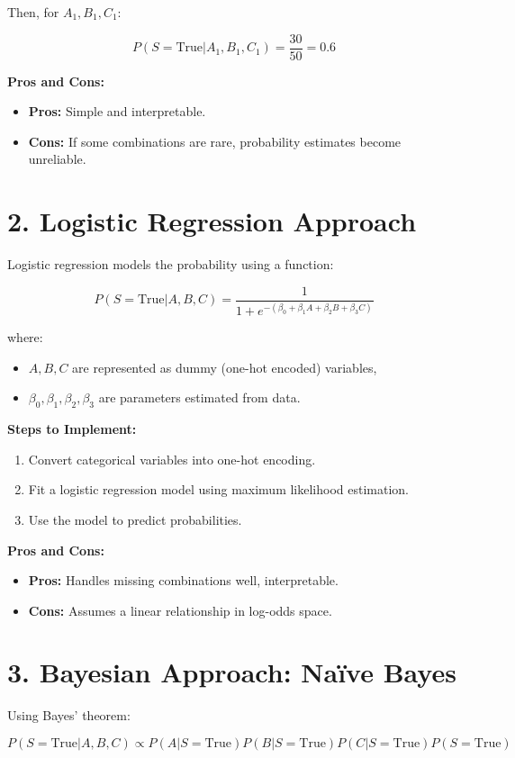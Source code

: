 \documentclass{article}
\begin{document}
Then, for \( A_1, B_1, C_1 \):

\[
P(S = \text{True} | A_1, B_1, C_1) = \frac{30}{50} = 0.6
\]

\textbf{Pros and Cons:}
\begin{itemize}
    \item \textbf{Pros:} Simple and interpretable.
    \item \textbf{Cons:} If some combinations are rare, probability estimates become unreliable.
\end{itemize}

\section{2. Logistic Regression Approach}
Logistic regression models the probability using a function:

\[
P(S = \text{True} | A, B, C) = \frac{1}{1 + e^{-(\beta_0 + \beta_1 A + \beta_2 B + \beta_3 C)}}
\]

where:
\begin{itemize}
    \item \( A, B, C \) are represented as dummy (one-hot encoded) variables,
    \item \( \beta_0, \beta_1, \beta_2, \beta_3 \) are parameters estimated from data.
\end{itemize}

\textbf{Steps to Implement:}
\begin{enumerate}
    \item Convert categorical variables into one-hot encoding.
    \item Fit a logistic regression model using maximum likelihood estimation.
    \item Use the model to predict probabilities.
\end{enumerate}

\textbf{Pros and Cons:}
\begin{itemize}
    \item \textbf{Pros:} Handles missing combinations well, interpretable.
    \item \textbf{Cons:} Assumes a linear relationship in log-odds space.
\end{itemize}

\section{3. Bayesian Approach: Naïve Bayes}
Using Bayes' theorem:

\[
P(S = \text{True} | A, B, C) \propto P(A | S = \text{True}) P(B | S = \text{True}) P(C | S = \text{True}) P(S = \text{True})
\]
\end{document}

